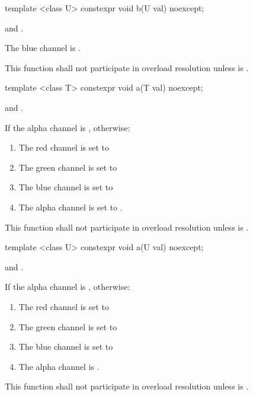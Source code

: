 %
\begin{itemdecl}
template <class U>
constexpr void b(U val) noexcept;
\end{itemdecl}
\begin{itemdescr}
\pnum
\requires
{} and .

\pnum
\effects
The blue channel is .

\pnum
\remarks
This function shall not participate in overload resolution unless  is .
\end{itemdescr}

%
\begin{itemdecl}
template <class T>
constexpr void a(T val) noexcept;
\end{itemdecl}
\begin{itemdescr}
\pnum
\requires
{} and .

\pnum
\effects
If  the alpha channel is , otherwise:
\begin{enumerate}
\item The red channel is set to 
\item The green channel is set to 
\item The blue channel is set to 
\item The alpha channel is set to .
\end{enumerate}

\pnum
\remarks
This function shall not participate in overload resolution unless  is .
\end{itemdescr}

%
\begin{itemdecl}
template <class U>
constexpr void a(U val) noexcept;
\end{itemdecl}
\begin{itemdescr}
\pnum
\requires
{} and .

\pnum
\effects
If  the alpha channel is , otherwise:
\begin{enumerate}
\item The red channel is set to 
\item The green channel is set to 
\item The blue channel is set to 
\item The alpha channel is .
\end{enumerate}

\pnum
\remarks
This function shall not participate in overload resolution unless  is .
\end{itemdescr}

